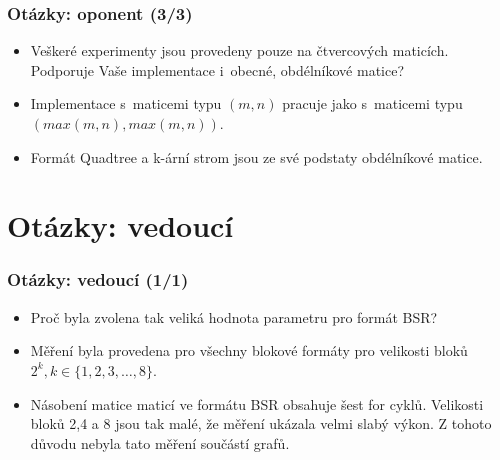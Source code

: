 \documentclass{beamer}
\newcommand{\backupend}{
   \setcounter{framenumber}{\value{finalframe}}
}
\begin{document}
\begin{frame}
	\frametitle{Otázky: oponent (3/3)}
	\begin{exampleblock}{}
		\begin{itemize}
			\item Veškeré experimenty jsou provedeny pouze na čtvercových maticích. Podporuje Vaše implementace i~obecné, obdélníkové
matice?
		\end{itemize}
	\end{exampleblock}
	\begin{alertblock}{}
	   \begin{itemize}
			\item Implementace s~maticemi typu $(m,n)$ pracuje jako s~maticemi typu $(max(m,n),max(m,n))$.
			\item Formát Quadtree a k-ární strom jsou ze své podstaty obdélníkové matice.
		\end{itemize}
	\end{alertblock}	
\end{frame}

\section{Otázky: vedoucí}
\begin{frame}
	\frametitle{Otázky: vedoucí (1/1)}
	\begin{exampleblock}{}
		\begin{itemize}
			\item Proč byla zvolena tak veliká hodnota parametru pro formát BSR?
		\end{itemize}
	\end{exampleblock}
	\begin{alertblock}{}
	   \begin{itemize}
			\item Měření byla provedena pro všechny blokové formáty pro velikosti bloků $2^k, k \in \{1,2,3,\ldots,8\}$.
			\item Násobení matice maticí ve formátu BSR obsahuje šest for cyklů. Velikosti bloků 2,4 a 8 jsou tak malé, že měření ukázala velmi slabý výkon. Z tohoto důvodu nebyla tato měření součástí grafů.
		\end{itemize}
	\end{alertblock}	
\end{frame}

\backupend
\end{document}
